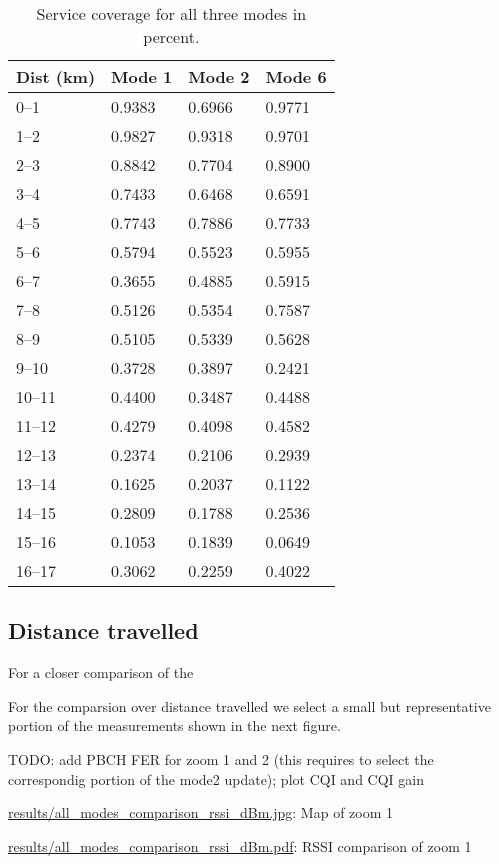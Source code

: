 \documentclass[a4paper,10pt]{article}
\newcommand{\printfile}[2][]{
 \begin{minipage}{8cm}
  \centering
  \url{#2}: #1

 \end{minipage}
}
\begin{document}
\begin{table}
\centering
\begin{tabular}{l|l|l|l}
Dist (km) & Mode 1 & Mode 2 & Mode 6\\
\hline
0--1 &   0.9383 &   0.6966 &   0.9771\\
1--2 &   0.9827 &   0.9318 &   0.9701\\
2--3 &   0.8842 &   0.7704 &   0.8900\\
3--4 &   0.7433 &   0.6468 &   0.6591\\
4--5 &   0.7743 &   0.7886 &   0.7733\\
5--6 &   0.5794 &   0.5523 &   0.5955\\
6--7 &   0.3655 &   0.4885 &   0.5915\\
7--8 &   0.5126 &   0.5354 &   0.7587\\
8--9 &   0.5105 &   0.5339 &   0.5628\\
9--10 &    0.3728 &   0.3897 &   0.2421\\
10--11 &   0.4400 &   0.3487 &   0.4488\\
11--12 &   0.4279 &   0.4098 &   0.4582\\
12--13 &   0.2374 &   0.2106 &   0.2939\\
13--14 &   0.1625 &   0.2037 &   0.1122\\
14--15 &   0.2809 &   0.1788 &   0.2536\\
15--16 &   0.1053 &   0.1839 &   0.0649\\
16--17 &   0.3062 &   0.2259 &   0.4022\\
\end{tabular}
\caption{Service coverage for all three modes in percent.}
\end{table}

\subsection{Distance travelled}
\label{sec:dist_travelled}
For a closer comparison of the 

For the comparsion over distance travelled we select a small but representative portion of the measurements shown in the next figure.

TODO: add PBCH FER for zoom 1 and 2 (this requires to select the correspondig portion of the mode2 update); plot CQI and CQI gain


\printfile[Map of zoom 1]{results/all_modes_comparison_rssi_dBm.jpg}
\printfile[RSSI comparison of zoom 1]{results/all_modes_comparison_rssi_dBm.pdf}
\end{document}
